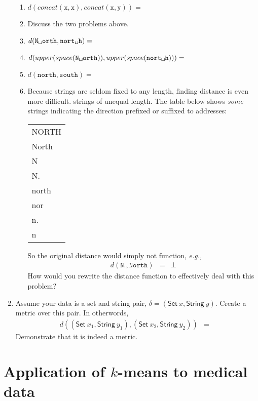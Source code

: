 \documentclass{article}
\begin{document}
\begin{enumerate}
\begin{enumerate}
\item $d(concat(\texttt{x}, \texttt{x}), concat(\texttt{x},\texttt{y})) = $
\item Discuss the two problems above.
\item $d(\texttt{N\textvisiblespace orth}, \texttt{nort\textvisiblespace h}) = $
\item $d(upper(space(\texttt{N\textvisiblespace orth})), upper(space(\texttt{nort\textvisiblespace h}))) = $
\item $d(\texttt{north}, \texttt{south}) = $
\item Because strings are seldom fixed to any length, finding distance is even more difficult. strings of unequal length.  The table below shows {\it some} strings indicating the direction prefixed or suffixed to addresses:
\begin{center}
\begin{tabular}{l} \hline 
NORTH \\
North \\
N \\
N. \\
north \\
nor \\
n.\\  
\textvisiblespace n \\ \hline 
\end{tabular}\end{center}
 So the original distance would simply not function, {\it e.g.,} 
\begin{eqnarray} d(\texttt{N.}, \texttt{North}) &=& \perp\end{eqnarray}
How would you rewrite the distance function to effectively deal with this problem?
\end{enumerate}
\item Assume your data is a set and string pair,  $\delta = ( \textsf{Set}\ x, \textsf{String}\ y)$.  Create a metric over this pair.  In otherwords, 
\begin{eqnarray*}
d((\textsf{Set}\ x_1, \textsf{String}\ y_1), (\textsf{Set}\ x_2, \textsf{String}\ y_2)) &=& 
\end{eqnarray*}
 Demonstrate that it is indeed a metric.
\end{enumerate}






\section{Application of $k$-means to medical data}
\end{document}
